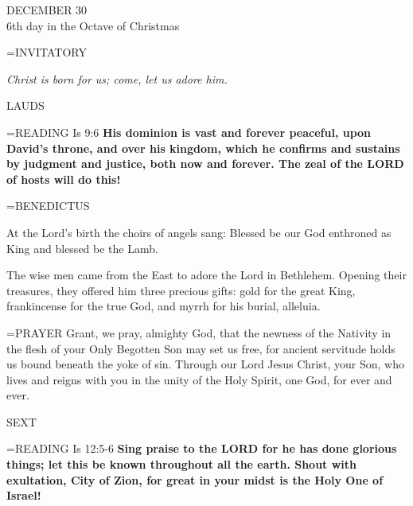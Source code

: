 \begin{center}\normalsize DECEMBER 30\\
\footnotesize 6th day in the Octave of Christmas\\
\end{center}

\hangindent=\parindent \small{INVITATORY}
\begin{center}
\textit{Christ is born for us; come, let us adore him.\\}
\end{center}

\begin{flushleft}\normalsize LAUDS\\\end{flushleft}

\hangindent=\parindent \small{READING}    Is 9:6 \textbf{   His dominion is vast and forever peaceful, upon David’s throne, and over his kingdom, which he confirms and sustains by judgment and justice, both now and forever. The zeal of the LORD of hosts will do this!\\}

\hangindent=\parindent \small BENEDICTUS
\begin{description}[labelindent=\parindent, noitemsep, leftmargin=*]
\item [(before Epiphany):]  At the Lord's birth the choirs of angels sang: Blessed be our God enthroned as King and blessed be the Lamb.
\item [(Monday after Epiphany):]  The wise men came from the East to adore the Lord in Bethlehem. Opening their treasures, they offered him three precious gifts: gold for the great King, frankincense for the true God, and myrrh for his burial, alleluia.
\end{description}


\hangindent=\parindent \small{PRAYER  Grant, we pray, almighty God, that the newness of the Nativity in the flesh of your Only Begotten Son may set us free, for ancient servitude holds us bound beneath the yoke of sin. Through our Lord Jesus Christ, your Son, who lives and reigns with you in the unity of the Holy Spirit, one God, for ever and ever.}

\begin{flushleft}\normalsize SEXT\\\end{flushleft}

\hangindent=\parindent \small{READING}    Is 12:5-6 \textbf{   Sing praise to the LORD for he has done glorious things; let this be known throughout all the earth. Shout with exultation, City of Zion, for great in your midst is the Holy One of Israel!}


